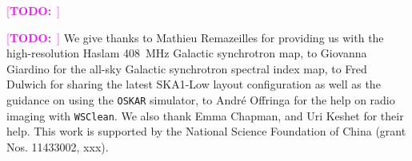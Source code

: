 \documentclass[modern]{aastex62}
\newcommand{\TODO}[1]{\textcolor{magenta}{[\textbf{TODO:}~\uuline{#1}]}}
\begin{document}
\TODO{Write!!!}


\acknowledgments

\TODO{update}
We give thanks
to Mathieu Remazeilles for providing us with the high-resolution Haslam
\SI{408}{\MHz} Galactic synchrotron map,
to Giovanna Giardino for the all-sky Galactic synchrotron spectral index map,
to Fred Dulwich for sharing the latest SKA1-Low layout configuration as well
as the guidance on using the \texttt{OSKAR} simulator,
to Andr\'e Offringa for the help on radio imaging with \texttt{WSClean}.
We also thank Emma Chapman, and Uri Keshet for their help.
This work is supported by the National Science Foundation of China
(grant Nos. 11433002, xxx).


%

\vspace{5mm}





\appendix
\end{document}
